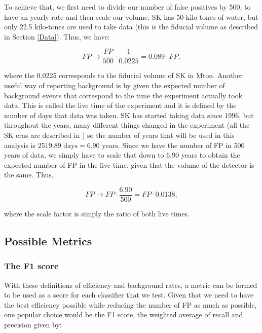 To achieve that, we first need to divide our number of false positives by 500, to have an yearly rate and then scale our volume. SK has 50 kilo-tones of water, but only 22.5 kilo-tones are used to take data (this is the fiducial volume as described in Section \ref{Data}). Thus, we have:

\begin{equation} \label{eq:mtonyear}
FP\rightarrow \frac{FP}{500}\cdot \frac{1}{0.0225} = 0.089\cdot FP,
\end{equation}

where the 0.0225 corresponds to the fiducial volume of SK in  $\textrm{Mton}$. Another useful way of reporting background is by given the expected number of background events that correspond to the time the experiment actually took data. This is called the live time of the experiment and it is defined by the number of days that data was taken. SK has started taking data since 1996, but throughout the years, many different things changed in the experiment (all the SK eras are described in \cite{SK}) so the number of years that will be used in this analysis is $2519.89\textrm{ days} = 6.90\textrm{ years}$. Since we have the number of FP in 500 years of data, we simply have to scale that down to 6.90 years to obtain the expected number of FP in the live time, given that the volume of the detector is the same. Thus, 

\begin{equation} \label{eq:livetime}
FP\rightarrow FP\cdot \frac{6.90}{500} = FP\cdot 0.0138,
\end{equation}

where the scale factor is simply the ratio of both live times.

\subsection{Possible Metrics} \label{Metric_sub}

\subsubsection{The F1 score} \label{F1_score}

With these definitions of efficiency and background rates, a metric can be formed to be used as a score for each classifier that we test. Given that we need to have the best efficiency possible while reducing the number of FP as much as possible, one popular choice would be the F1 score, the weighted average of recall and precision given by:


